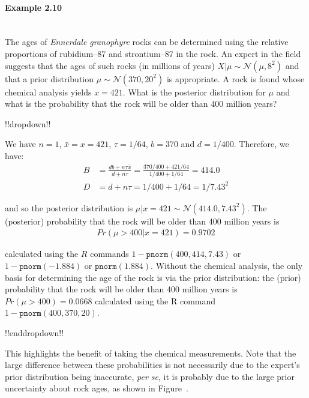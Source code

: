 \paragraph{Example 2.10}{~\\
The ages of {\it Ennerdale granophyre} rocks can be determined using  the relative proportions of rubidium--87 and strontium--87 in the rock. An expert in the field suggests that the ages of such rocks (in millions of years) $X|\mu\sim \mathcal{N}(\mu,8^2)$ and that a prior distribution $\mu\sim \mathcal{N}(370,20^2)$ is appropriate. A rock is found whose chemical analysis yields $x=421$. What is the posterior distribution for $\mu$ and what is the probability that the rock will be older than 400 million years?

!!dropdown!!

We have $n=1$, $\bar x=x=421$, $\tau=1/64$, $b=370$ and $d=1/400$. Therefore, we have:
        \begin{align*}
        B&=\frac{db+n\tau\bar x}{d+n\tau}
        =\frac{370/400+421/64}{1/400+1/64}=414.0\\
        D&=d+n\tau=1/400+1/64=1/7.43^2
        \end{align*}
        
        and so the posterior distribution is $\mu|x=421\sim \mathcal{N}(414.0,7.43^2)$. The (posterior) probability that the rock will be older than 400 million years is
        \begin{align*}
        Pr(\mu>400|x=421)=0.9702
        \end{align*}
        
        calculated using the $R$ commands $1-\texttt{pnorm}(400,414,7.43)$ or $1-\texttt{pnorm}(-1.884)$ or $\texttt{pnorm}(1.884)$. Without the chemical analysis, the only basis for determining the age of the rock is via the prior distribution: the (prior) probability that the rock will be older than 400 million years is $Pr(\mu>400)=0.0668$ calculated using the R command $1-\texttt{pnorm}(400,370,20)$.

!!enddropdown!!




This highlights the benefit of taking the chemical measurements. Note that the large difference between these probabilities is not necessarily due to the expert's prior distribution being inaccurate, {\it per se}, it is probably due to the large prior uncertainty about rock ages, as shown in Figure~.
\begin{figure}[ht]


\end{figure}}
